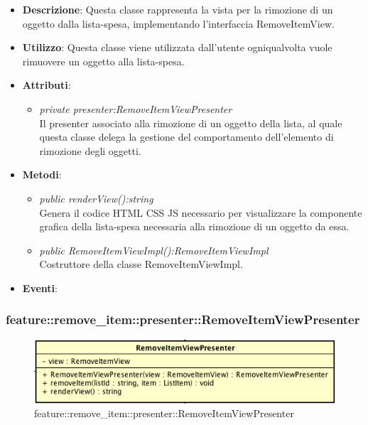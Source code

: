 \begin{itemize}
\item \textbf{Descrizione}: Questa classe rappresenta la vista per la rimozione di un oggetto dalla lista-spesa, implementando l'interfaccia RemoveItemView.
\item \textbf{Utilizzo}: Questa classe viene utilizzata dall'utente ogniqualvolta vuole rimuovere un oggetto alla lista-spesa.
\item \textbf{Attributi}: 
	\begin{itemize}
	\item \textit{private presenter:RemoveItemViewPresenter}\\
	Il presenter associato alla rimozione di un oggetto della lista, al quale questa classe delega la gestione del comportamento dell'elemento di rimozione degli oggetti.
	\end{itemize}
\item \textbf{Metodi}:
	\begin{itemize}
	\item \textit{public renderView():string}\\
		Genera il codice HTML CSS JS necessario per visualizzare la componente grafica della lista-spesa necessaria alla rimozione di un oggetto da essa.
	\item \textit{public RemoveItemViewImpl():RemoveItemViewImpl}\\
	Costruttore della classe RemoveItemViewImpl.
	\end{itemize}
\item \textbf{Eventi}:
\end{itemize}

\subsubsection{feature::remove\_item::presenter::RemoveItemViewPresenter}

\label{feature::remove_item::presenter::RemoveItemViewPresenter}
\begin{figure}[ht]
	\centering
	\includegraphics[scale=0.5]{Sezioni/SottosezioniST/img/app/RemoveItemViewPresenter.png}
	\caption{feature::remove\_item::presenter::RemoveItemViewPresenter}
\end{figure}

